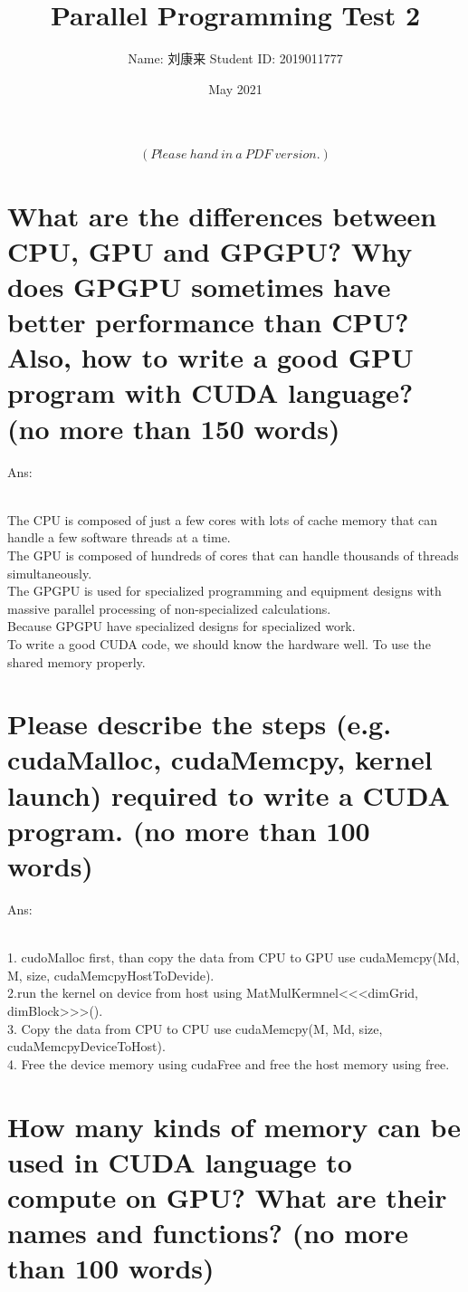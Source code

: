 \documentclass{article}
\title{Parallel Programming Test 2}
\author{Name: 刘康来  \qquad Student ID: 2019011777}
\date{May 2021}
\begin{document}
\maketitle
$$(Please\ hand\ in\ a\ PDF\ version.)$$


\section{What are the differences between CPU, GPU and GPGPU? Why does GPGPU sometimes have better performance than CPU? Also, how to write a good GPU program with CUDA language? (no more than 150 words)}

Ans:%

~\\The CPU is composed of just a few cores with lots of cache memory that can handle a few software threads at a time. 
\\The GPU is composed of hundreds of cores that can handle thousands of threads simultaneously.
\\The GPGPU is used for specialized programming and equipment designs with massive parallel processing of non-specialized calculations.
\\Because GPGPU have specialized designs for specialized work.
\\To write a good CUDA code, we should know the hardware well. To use the shared memory properly.

\section{Please describe the steps (e.g. cudaMalloc, cudaMemcpy, kernel launch) required to write a CUDA program. (no more than 100 words)}

Ans:%

~\\1. cudoMalloc first, than copy the data from CPU to GPU use cudaMemcpy(Md, M, size, cudaMemcpyHostToDevide).
\\2.run the kernel on device from host using MatMulKermnel<<<dimGrid, dimBlock>>>().
\\3. Copy the data from CPU to CPU use cudaMemcpy(M, Md, size, cudaMemcpyDeviceToHost).
\\4. Free the device memory using cudaFree and free the host memory using free.

\section{How many kinds of memory can be used in CUDA language to compute on GPU? What are their names and functions? (no more than 100 words)}
\end{document}
